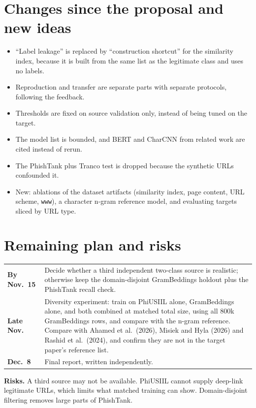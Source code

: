 \documentclass[10pt]{article}
\begin{document}
\section{Changes since the proposal and new ideas}
\begin{itemize}
\setlength\itemsep{0pt}
\item ``Label leakage'' is replaced by ``construction shortcut'' for the similarity index, because it is built from the same list as the legitimate class and uses no labels.
\item Reproduction and transfer are separate parts with separate protocols, following the feedback.
\item Thresholds are fixed on source validation only, instead of being tuned on the target.
\item The model list is bounded, and BERT and CharCNN from related work are cited instead of rerun.
\item The PhishTank plus Tranco test is dropped because the synthetic URLs confounded it.
\item New: ablations of the dataset artifacts (similarity index, page content, URL scheme, \texttt{www}), a character n-gram reference model, and evaluating targets sliced by URL type.
\end{itemize}

\section{Remaining plan and risks}
\begin{tabular}{@{}p{1.1in}p{5.8in}@{}}
\textbf{By Nov.\ 15} & Decide whether a third independent two-class source is realistic; otherwise keep the domain-disjoint GramBeddings holdout plus the PhishTank recall check. \\
\textbf{Late Nov.} & Diversity experiment: train on PhiUSIIL alone, GramBeddings alone, and both combined at matched total size, using all 800k GramBeddings rows, and compare with the n-gram reference. Compare with Ahamed et al.\ (2026), Misiek and Hyla (2026) and Rashid et al.\ (2024), and confirm they are not in the target paper's reference list. \\
\textbf{Dec.\ 8} & Final report, written independently. \\
\end{tabular}

\textbf{Risks.} A third source may not be available. PhiUSIIL cannot supply deep-link legitimate URLs, which limits what matched training can show. Domain-disjoint filtering removes large parts of PhishTank.
\end{document}
